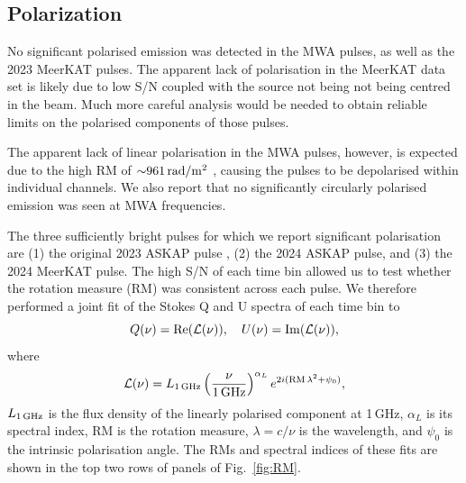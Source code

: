 \documentclass[fleqn,usenatbib]{mnras}
\newcommand{\Fig}{Fig.}
\begin{document}

\subsection{Polarization} \label{sec:polarization}

No significant polarised emission was detected in the MWA pulses, as well as the 2023 MeerKAT pulses.
The apparent lack of polarisation in the MeerKAT data set is likely due to low S/N coupled with the source not being not being centred in the beam.
Much more careful analysis would be needed to obtain reliable limits on the polarised components of those pulses.

The apparent lack of linear polarisation in the MWA pulses, however, is expected due to the high RM of ${\sim}961\,{\rm rad}/{\rm m}^2$ , causing the pulses to be depolarised within individual channels.
We also report that no significantly circularly polarised emission was seen at MWA frequencies.

The three sufficiently bright pulses for which we report significant polarisation are (1) the original 2023 ASKAP pulse , (2) the 2024 ASKAP pulse, and (3) the 2024 MeerKAT pulse.
The high S/N of each time bin allowed us to test whether the rotation measure (RM) was consistent across each pulse.
We therefore performed a joint fit of the Stokes Q and U spectra of each time bin to
\begin{equation}
    Q(\nu) = {\rm Re}(\mathcal{L}(\nu)),
    \quad
    U(\nu) = {\rm Im}(\mathcal{L}(\nu)),
    \label{eqn:RM}
\end{equation}
where
\begin{equation}
    \mathcal{L}(\nu)
        = L_{\rm 1\,GHz}\left(\frac{\nu}{\rm 1\,GHz}\right)^{\alpha_L} e^{2i({\rm RM}\,\lambda^2 + \psi_0)},
\end{equation}
$L_{\rm 1\,GHz}$ is the flux density of the linearly polarised component at 1\,GHz, $\alpha_L$ is its spectral index, RM is the rotation measure, $\lambda = c/\nu$ is the wavelength, and $\psi_0$ is the intrinsic polarisation angle.
The RMs and spectral indices of these fits are shown in the top two rows of panels of \Fig~\ref{fig:RM}.
\end{document}
